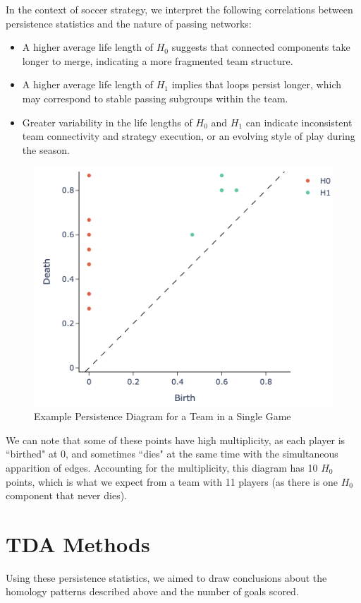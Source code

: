 \documentclass[10pt,twocolumn]{article}
\begin{document}
In the context of soccer strategy, we interpret the following correlations between persistence statistics and the nature of passing networks: 
\begin{itemize}
    \item A higher average life length of $ H_0 $ suggests that connected components take longer to merge, indicating a more fragmented team structure.
    \item A higher average life length of $ H_1 $ implies that loops persist longer, which may correspond to stable passing subgroups within the team.
    \item Greater variability in the life lengths of $ H_0 $ and $ H_1 $ can indicate inconsistent team connectivity and strategy execution, or an evolving style of play during the season.
\end{itemize}

\begin{figure}[H]
    \centering
    \includegraphics[width=0.7\linewidth]{images/birthdeath.png}
    \caption{Example Persistence Diagram for a Team in a Single Game}
    \label{fig:persistence_diagram}
\end{figure}

We can note that some of these points have high multiplicity, as each player is ``birthed" at 0, and sometimes ``dies" at the same time with the simultaneous apparition of edges. Accounting for the multiplicity, this diagram has 10 $ H_0 $ points, which is what we expect from a team with 11 players (as there is one $ H_0 $ component that never dies).

\section*{TDA Methods}

Using these persistence statistics, we aimed to draw conclusions about the homology patterns described above and the number of goals scored. 
\end{document}
